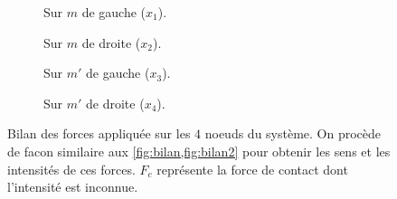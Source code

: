 \begin{figure}[!h]
    \begin{subfigure}[b]{0.30\textwidth}
        \centering
        \caption{Sur $m$ de gauche ($x_1$).}
        \label{fig:bilan13}
    \end{subfigure}
    \begin{subfigure}[b]{0.35\textwidth}
        \centering
        \caption{Sur $m$ de droite ($x_2$).}
        \label{fig:bilan23}
    \end{subfigure}
    \begin{subfigure}[b]{0.35\textwidth}
        \centering
        \caption{Sur $m'$ de gauche ($x_3$).}
        \label{fig:bilan33}
    \end{subfigure}
    \begin{subfigure}[b]{0.30\textwidth}
        \centering
        \caption{Sur $m'$ de droite ($x_4$).}
        \label{fig:bilan43}
    \end{subfigure}
       \caption{Bilan des forces appliquée sur les $4$ noeuds du système. On procède de facon similaire aux \cref{fig:bilan,fig:bilan2} pour obtenir les sens et les intensités de ces forces. $F_c$ représente la force de contact dont l'intensité est inconnue.}
       \label{fig:bilan3}
\end{figure}

